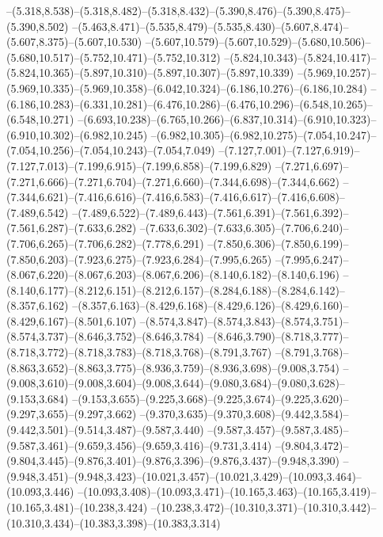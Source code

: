   --(5.318,8.538)--(5.318,8.482)--(5.318,8.432)--(5.390,8.476)--(5.390,8.475)--(5.390,8.502)%
  --(5.463,8.471)--(5.535,8.479)--(5.535,8.430)--(5.607,8.474)--(5.607,8.375)--(5.607,10.530)%
  --(5.607,10.579)--(5.607,10.529)--(5.680,10.506)--(5.680,10.517)--(5.752,10.471)--(5.752,10.312)%
  --(5.824,10.343)--(5.824,10.417)--(5.824,10.365)--(5.897,10.310)--(5.897,10.307)--(5.897,10.339)%
  --(5.969,10.257)--(5.969,10.335)--(5.969,10.358)--(6.042,10.324)--(6.186,10.276)--(6.186,10.284)%
  --(6.186,10.283)--(6.331,10.281)--(6.476,10.286)--(6.476,10.296)--(6.548,10.265)--(6.548,10.271)%
  --(6.693,10.238)--(6.765,10.266)--(6.837,10.314)--(6.910,10.323)--(6.910,10.302)--(6.982,10.245)%
  --(6.982,10.305)--(6.982,10.275)--(7.054,10.247)--(7.054,10.256)--(7.054,10.243)--(7.054,7.049)%
  --(7.127,7.001)--(7.127,6.919)--(7.127,7.013)--(7.199,6.915)--(7.199,6.858)--(7.199,6.829)%
  --(7.271,6.697)--(7.271,6.666)--(7.271,6.704)--(7.271,6.660)--(7.344,6.698)--(7.344,6.662)%
  --(7.344,6.621)--(7.416,6.616)--(7.416,6.583)--(7.416,6.617)--(7.416,6.608)--(7.489,6.542)%
  --(7.489,6.522)--(7.489,6.443)--(7.561,6.391)--(7.561,6.392)--(7.561,6.287)--(7.633,6.282)%
  --(7.633,6.302)--(7.633,6.305)--(7.706,6.240)--(7.706,6.265)--(7.706,6.282)--(7.778,6.291)%
  --(7.850,6.306)--(7.850,6.199)--(7.850,6.203)--(7.923,6.275)--(7.923,6.284)--(7.995,6.265)%
  --(7.995,6.247)--(8.067,6.220)--(8.067,6.203)--(8.067,6.206)--(8.140,6.182)--(8.140,6.196)%
  --(8.140,6.177)--(8.212,6.151)--(8.212,6.157)--(8.284,6.188)--(8.284,6.142)--(8.357,6.162)%
  --(8.357,6.163)--(8.429,6.168)--(8.429,6.126)--(8.429,6.160)--(8.429,6.167)--(8.501,6.107)%
  --(8.574,3.847)--(8.574,3.843)--(8.574,3.751)--(8.574,3.737)--(8.646,3.752)--(8.646,3.784)%
  --(8.646,3.790)--(8.718,3.777)--(8.718,3.772)--(8.718,3.783)--(8.718,3.768)--(8.791,3.767)%
  --(8.791,3.768)--(8.863,3.652)--(8.863,3.775)--(8.936,3.759)--(8.936,3.698)--(9.008,3.754)%
  --(9.008,3.610)--(9.008,3.604)--(9.008,3.644)--(9.080,3.684)--(9.080,3.628)--(9.153,3.684)%
  --(9.153,3.655)--(9.225,3.668)--(9.225,3.674)--(9.225,3.620)--(9.297,3.655)--(9.297,3.662)%
  --(9.370,3.635)--(9.370,3.608)--(9.442,3.584)--(9.442,3.501)--(9.514,3.487)--(9.587,3.440)%
  --(9.587,3.457)--(9.587,3.485)--(9.587,3.461)--(9.659,3.456)--(9.659,3.416)--(9.731,3.414)%
  --(9.804,3.472)--(9.804,3.445)--(9.876,3.401)--(9.876,3.396)--(9.876,3.437)--(9.948,3.390)%
  --(9.948,3.451)--(9.948,3.423)--(10.021,3.457)--(10.021,3.429)--(10.093,3.464)--(10.093,3.446)%
  --(10.093,3.408)--(10.093,3.471)--(10.165,3.463)--(10.165,3.419)--(10.165,3.481)--(10.238,3.424)%
  --(10.238,3.472)--(10.310,3.371)--(10.310,3.442)--(10.310,3.434)--(10.383,3.398)--(10.383,3.314)%
